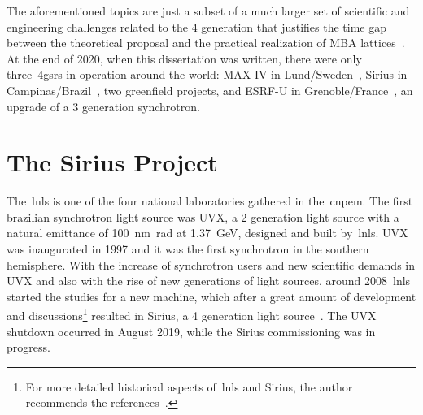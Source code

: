 The aforementioned topics are just a subset of a much larger set of scientific and engineering challenges related to the 4 generation that justifies the time gap between the theoretical proposal and the practical realization of MBA lattices~\cite{hettel, neuenschwander}. At the end of 2020, when this dissertation was written, there were only three~\glspl{4gsr} in operation around the world: MAX-IV in Lund/Sweden~\cite{tavaresmaxiv}, Sirius in Campinas/Brazil~\cite{liu2014}, two greenfield projects, and ESRF-U in Grenoble/France~\cite{raimondi}, an upgrade of a 3 generation synchrotron.
\section{The Sirius Project}\label{sec:sirius_project}
The~\gls{lnls} is one of the four national laboratories gathered in the~\gls{cnpem}. The first brazilian synchrotron light source was UVX, a 2 generation light source with a natural emittance of \SI{100}{\nano\meter\radian} at \SI{1.37}{\giga\electronvolt}, designed and built by~\gls{lnls}. UVX was inaugurated in 1997 and it was the first synchrotron in the southern hemisphere. With the increase of synchrotron users and new scientific demands in UVX and also with the rise of new generations of light sources, around 2008~\gls{lnls} started the studies for a new machine, which after a great amount of development and discussions\footnote{For more detailed historical aspects of~\gls{lnls} and Sirius, the author recommends the references~\cite{liu2019, aldo2019}.} resulted in Sirius, a 4 generation light source~\cite{liu2014}. The UVX shutdown occurred in August 2019, while the Sirius commissioning was in progress.

